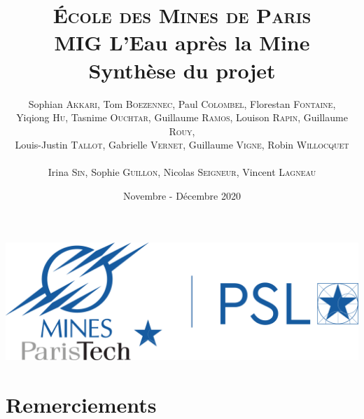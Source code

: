 \documentclass{article}
\title{\textbf{\LARGE{\textsc{École des Mines de Paris}}\\ \vspace{1 cm}MIG L'Eau après la Mine\\\vspace{0.8 cm}Synthèse du projet}\vspace{1 cm}}
\author{Sophian \textsc{Akkari}, Tom \textsc{Boezennec}, Paul \textsc{Colombel}, Florestan \textsc{Fontaine},\\ Yiqiong \textsc{Hu}, Tasnime \textsc{Ouchtar}, Guillaume \textsc{Ramos}, Louison \textsc{Rapin}, Guillaume \textsc{Rouy},\\ Louis-Justin \textsc{Tallot}, Gabrielle \textsc{Vernet}, Guillaume \textsc{Vigne}, Robin \textsc{Willocquet}\\ \\ Irina \textsc{Sin}, Sophie \textsc{Guillon}, Nicolas \textsc{Seigneur}, Vincent \textsc{Lagneau}}
\date{\vspace{2 cm}Novembre - Décembre 2020}
\begin{document}

\maketitle
\thispagestyle{empty}
\vspace{2 cm}
\begin{center}
    \includegraphics[width = 0.4\linewidth]{logoMPT.png}
\end{center}
\newpage
{}
\section*{Remerciements}
\end{document}

